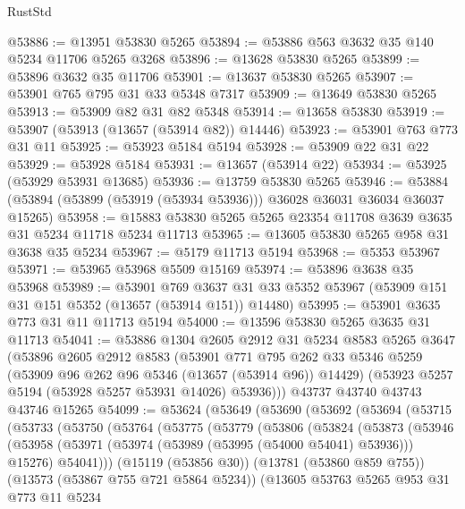 \begin{lexlean}{RustStd}
\begin{coremodule}
@53886 := @13951 @53830 @5265
@53894 := @53886 @563 @3632 @35 @140 @5234 @11706 @5265 @3268
@53896 := @13628 @53830 @5265
@53899 := @53896 @3632 @35 @11706
@53901 := @13637 @53830 @5265
@53907 := @53901 @765 @795 @31 @33 @5348 @7317
@53909 := @13649 @53830 @5265
@53913 := @53909 @82 @31 @82 @5348
@53914 := @13658 @53830
@53919 := @53907 (@53913 (@13657 (@53914 @82)) @14446)
@53923 := @53901 @763 @773 @31 @11
@53925 := @53923 @5184 @5194
@53928 := @53909 @22 @31 @22
@53929 := @53928 @5184
@53931 := @13657 (@53914 @22)
@53934 := @53925 (@53929 @53931 @13685)
@53936 := @13759 @53830 @5265
@53946 := @53884 (@53894 (@53899 (@53919 (@53934 @53936))) @36028 @36031 @36034 @36037 @15265)
@53958 := @15883 @53830 @5265 @5265 @23354 @11708 @3639 @3635 @31 @5234 @11718 @5234 @11713
@53965 := @13605 @53830 @5265 @958 @31 @3638 @35 @5234
@53967 := @5179 @11713 @5194
@53968 := @5353 @53967
@53971 := @53965 @53968 @5509 @15169
@53974 := @53896 @3638 @35 @53968
@53989 := @53901
    @769
    @3637
    @31
    @33
    @5352
    @53967
    (@53909 @151 @31 @151 @5352 (@13657 (@53914 @151)) @14480)
@53995 := @53901 @3635 @773 @31 @11 @11713 @5194
@54000 := @13596 @53830 @5265 @3635 @31 @11713
@54041 := @53886
    @1304
    @2605
    @2912
    @31
    @5234
    @8583
    @5265
    @3647
    (@53896
      @2605
      @2912
      @8583
      (@53901
        @771
        @795
        @262
        @33
        @5346
        @5259
        (@53909 @96 @262 @96 @5346 (@13657 (@53914 @96)) @14429)
        (@53923 @5257 @5194 (@53928 @5257 @53931 @14026) @53936)))
    @43737
    @43740
    @43743
    @43746
    @15265
@54099 := @53624
    (@53649
      (@53690
        (@53692
          (@53694
            (@53715
              (@53733
                (@53750
                  (@53764
                    (@53775
                      (@53779
                        (@53806
                          (@53824
                            (@53873
                              (@53946
                                (@53958
                                  (@53971 (@53974 (@53989 (@53995 (@54000 @54041) @53936))) @15276)
                                  @54041)))
                            (@15119 (@53856 @30))
                            (@13781 (@53860 @859 @755))
                            (@13573 (@53867 @755 @721 @5864 @5234))
                            (@13605
                              @53763
                              @5265
                              @953
                              @31
                              @773
                              @11
                              @5234

\end{coremodule}
\end{lexlean}
